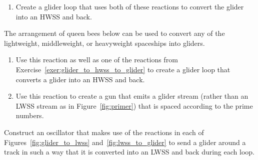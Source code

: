 \begin{multicols}{2}
\begin{problem}
\begin{enumerate}[label=\bf\color{ocre}(\alph*)]
		\item Create a glider loop that uses both of these reactions to convert the glider into an HWSS and back.
	\end{enumerate}
\end{problem}


\mfilbreak


\begin{problem}\label{exer:any_wss_to_glider}
	The arrangement of queen bees below can be used to convert any of the lightweight, middleweight, or heavyweight spaceships into gliders.
	\begin{center}
	\end{center}
	\begin{enumerate}[label=\bf\color{ocre}(\alph*)]
		\item Use this reaction as well as one of the reactions from Exercise~\ref{exer:glider_to_hwss_to_glider} to create a glider loop that converts a glider into an HWSS and back.
		
		\item Use this reaction to create a gun that emits a glider stream (rather than an LWSS stream as in Figure~\ref{fig:primer}) that is spaced according to the prime numbers.
	\end{enumerate}
\end{problem}


\mfilbreak


\begin{problem}\label{exer:glider_to_lwss_loop}
	Construct an oscillator that makes use of the reactions in each of Figures~\ref{fig:glider_to_lwss} and~\ref{fig:lwss_to_glider} to send a glider around a track in such a way that it is converted into an LWSS and back during each loop.
\end{problem}



\end{multicols}
